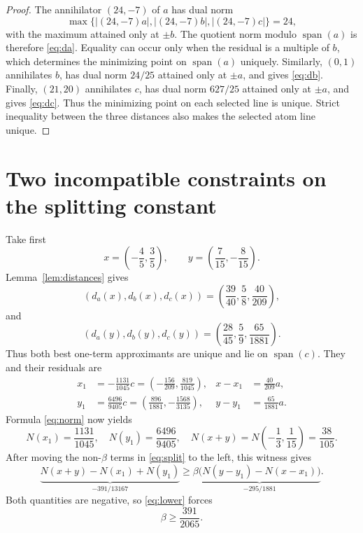 \documentclass[11pt]{article}
\newcommand{\Span}{\operatorname{span}}
\begin{document}
\begin{proof}
The annihilator $(24,-7)$ of $a$ has dual norm
\[
 \max\{|(24,-7)a|,|(24,-7)b|,|(24,-7)c|\}=24,
\]
with the maximum attained only at $\pm b$. The quotient norm modulo
$\Span(a)$ is therefore \eqref{eq:da}. Equality can occur only when the
residual is a multiple of $b$, which determines the minimizing point on
$\Span(a)$ uniquely. Similarly, $(0,1)$ annihilates $b$, has dual norm
$24/25$ attained only at $\pm a$, and gives \eqref{eq:db}. Finally,
$(21,20)$ annihilates $c$, has dual norm $627/25$ attained only at $\pm a$,
and gives \eqref{eq:dc}. Thus the minimizing point on each selected line is
unique. Strict inequality between the three distances also makes the selected
atom line unique.
\end{proof}

\section{Two incompatible constraints on the splitting constant}

Take first
\[
 x=\left(-\frac45,\frac35\right),\qquad
 y=\left(\frac7{15},-\frac8{15}\right).
\]
Lemma~\ref{lem:distances} gives
\[
 (d_a(x),d_b(x),d_c(x))
 =\left(\frac{39}{40},\frac58,\frac{40}{209}\right),
\]
and
\[
 (d_a(y),d_b(y),d_c(y))
 =\left(\frac{28}{45},\frac59,\frac{65}{1881}\right).
\]
Thus both best one-term approximants are unique and lie on $\Span(c)$. They
and their residuals are
\begin{align*}
 x_1&=-\frac{1131}{1045}c
 =\left(-\frac{156}{209},\frac{819}{1045}\right),
 &x-x_1&=\frac{40}{209}a,\\
 y_1&=\frac{6496}{9405}c
 =\left(\frac{896}{1881},-\frac{1568}{3135}\right),
 &y-y_1&=\frac{65}{1881}a.
\end{align*}
Formula \eqref{eq:norm} now yields
\[
 N(x_1)=\frac{1131}{1045},\quad
 N(y_1)=\frac{6496}{9405},\quad
 N(x+y)=N\left(-\frac13,\frac1{15}\right)=\frac{38}{105}.
\]
After moving the non-$\beta$ terms in \eqref{eq:split} to the left, this
witness gives
\begin{equation}\label{eq:lower}
 \underbrace{N(x+y)-N(x_1)+N(y_1)}_{-391/13167}
 \geq
 \beta\underbrace{\bigl(N(y-y_1)-N(x-x_1)\bigr)}_{-295/1881}.
\end{equation}
Both quantities are negative, so \eqref{eq:lower} forces
\begin{equation}\label{eq:lowerbound}
 \beta\geq\frac{391}{2065}.
\end{equation}
\end{document}
